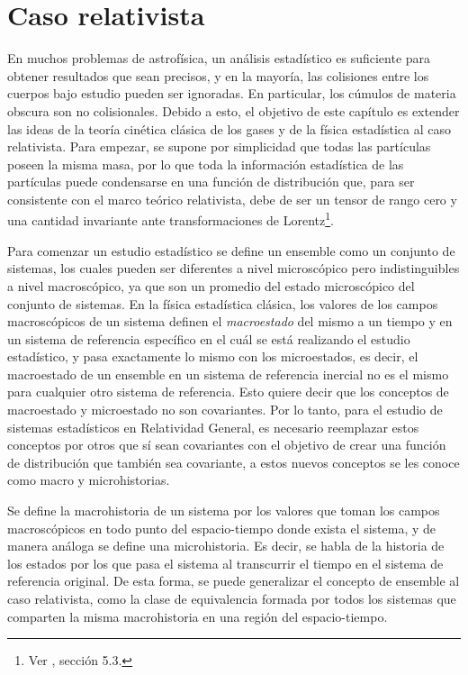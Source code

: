 \documentclass[11pt,twoside,openright,spanish]{report}
\numberwithin{equation}{chapter}
\numberwithin{figure}{chapter}
\numberwithin{table}{chapter}
\begin{document}
\section{Caso relativista}
\noindent
En muchos problemas de astrofísica, un análisis estadístico es suficiente para obtener resultados que sean precisos, y en la mayoría, las colisiones entre los cuerpos bajo estudio pueden ser ignoradas. En particular, los cúmulos de materia obscura son no colisionales. Debido a esto, el objetivo de este capítulo es extender las ideas de la teoría cinética clásica de los gases y de la física estadística al caso relativista. Para empezar, se supone por simplicidad que todas las partículas poseen la misma masa, por lo que toda la información estadística de las partículas puede condensarse en una función de distribución que, para ser consistente con el marco teórico relativista, debe de ser un tensor de rango cero y una cantidad invariante ante transformaciones de Lorentz\footnote{Ver \citet{Shapiro2010}, sección 5.3.}.

Para comenzar un estudio estadístico se define un ensemble como un conjunto de sistemas, los cuales pueden ser diferentes a nivel microscópico pero indistinguibles a nivel macroscópico, ya que son un promedio del estado microscópico del conjunto de sistemas. En la física estadística clásica, los valores de los campos macroscópicos de un sistema definen el \textit{macroestado} del mismo a un tiempo y en un sistema de referencia específico en el cuál se está realizando el estudio estadístico, y pasa exactamente lo mismo con los microestados, es decir, el macroestado de un ensemble en un sistema de referencia inercial no es el mismo para cualquier otro sistema de referencia. Esto quiere decir que los conceptos de macroestado y microestado no son covariantes. Por lo tanto, para el estudio de sistemas estadísticos en Relatividad General, es necesario reemplazar estos conceptos por otros que sí sean covariantes con el objetivo de crear una función de distribución que también sea covariante, a estos nuevos conceptos se les conoce como macro y microhistorias.

Se define la macrohistoria de un sistema por los valores que toman los campos macroscópicos en todo punto del espacio-tiempo donde exista el sistema, y de manera análoga se define una microhistoria. Es decir, se habla de la historia de los estados por los que pasa el sistema al transcurrir el tiempo en el sistema de referencia original. De esta forma, se puede generalizar el concepto de ensemble al caso relativista, como la clase de equivalencia formada por todos los sistemas que comparten la misma macrohistoria en una región del espacio-tiempo.
\end{document}
